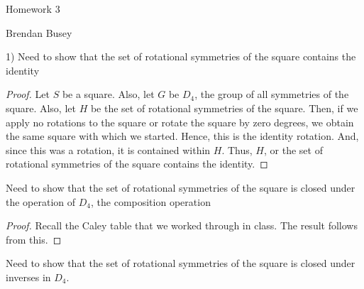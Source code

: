 \documentclass[executivepaper]{article}
\begin{document}
\begin{center}

Homework 3

\end{center}

\begin{flushright}

Brendan Busey

\end{flushright}

\begin{flushleft}

1) Need to show that the set of rotational symmetries of the square contains the identity

\vspace{3mm}

\begin{center}

\begin{proof}

Let $S$ be a square. Also, let $G$ be $D_{4}$, the group of all symmetries of the square. Also, let $H$ be the set of rotational symmetries of the square. Then, if we apply no rotations to the square or rotate the square by zero degrees, we obtain the same square with which we started. Hence, this is the identity rotation. And, since this was a rotation, it is contained within $H$. Thus, $H$, or the set of rotational symmetries of the square contains the identity.

\end{proof}

\end{center}

Need to show that the set of rotational symmetries of the square is closed under the operation of $D_{4}$, the composition operation

\begin{center}

\begin{proof}

Recall the Caley table that we worked through in class. The result follows from this.

\end{proof}

\end{center}

Need to show that the set of rotational symmetries of the square is closed under inverses in $D_{4}$.

\begin{center}


\end{center}
\end{flushleft}
\end{document}
